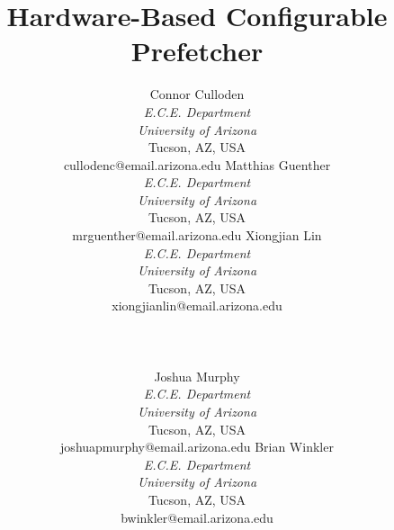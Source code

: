 \documentclass[conference]{IEEEtran}
\newlength{\authorboxwidth}
\begin{document}
\title{Hardware-Based Configurable Prefetcher}

\author{
\begin{tabular}{ c c c }
	\parbox[t]{\authorboxwidth}{\centering
		Connor Culloden \\
		\textit{E.C.E. Department} \\
		\textit{University of Arizona} \\
		Tucson, AZ, USA \\
		cullodenc@email.arizona.edu
	}
	&
	\parbox[t]{\authorboxwidth}{\centering
		Matthias Guenther \\
		\textit{E.C.E. Department} \\
		\textit{University of Arizona} \\
		Tucson, AZ, USA \\
		mrguenther@email.arizona.edu
	}
	&
	\parbox[t]{\authorboxwidth}{\centering
		Xiongjian Lin \\
		\textit{E.C.E. Department} \\
		\textit{University of Arizona} \\
		Tucson, AZ, USA \\
		xiongjianlin@email.arizona.edu
	}
\end{tabular}
\\
\\
\setlength{\tabcolsep}{12pt} %
\begin{tabular}{ c c }
	\parbox[t]{\authorboxwidth}{\centering
		Joshua Murphy \\
		\textit{E.C.E. Department} \\
		\textit{University of Arizona} \\
		Tucson, AZ, USA \\
		joshuapmurphy@email.arizona.edu
	}
	&
	\parbox[t]{\authorboxwidth}{\centering
		Brian Winkler \\
		\textit{E.C.E. Department} \\
		\textit{University of Arizona} \\
		Tucson, AZ, USA \\
		bwinkler@email.arizona.edu
	}
\end{tabular}
\setlength{\tabcolsep}{6pt} %
}

\maketitle

\end{document}
